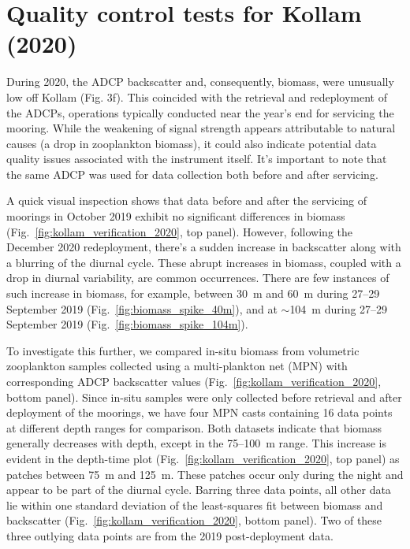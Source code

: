 \documentclass[12pt,a4paper]{article}
\begin{document}
\section{Quality control tests for Kollam (2020)}
\label{sec:QC_kollam}

During 2020, the ADCP backscatter and, consequently, biomass, were unusually low off Kollam (Fig. 3f). This coincided with the retrieval and redeployment of the ADCPs, operations typically conducted near the year's end for servicing the mooring. While the weakening of signal strength appears attributable to natural causes (a drop in zooplankton biomass), it could also indicate potential data quality issues associated with the instrument itself. It's important to note that the same ADCP was used for data collection both before and after servicing.

A quick visual inspection shows that data before and after the servicing of moorings in October 2019 exhibit no significant differences in biomass (Fig.~\ref{fig:kollam_verification_2020}, top panel). However, following the December 2020 redeployment, there's a sudden increase in backscatter along with a blurring of the diurnal cycle. These abrupt increases in biomass, coupled with a drop in diurnal variability, are common occurrences. There are few instances of such increase in biomass, for example, between 30~m and 60~m during 27--29 September 2019 (Fig.~\ref{fig:biomass_spike_40m}), and at $\sim$104~m during 27--29 September 2019 (Fig.~\ref{fig:biomass_spike_104m}).

To investigate this further, we compared in-situ biomass from volumetric zooplankton samples collected using a multi-plankton net (MPN) with corresponding ADCP backscatter values (Fig.~\ref{fig:kollam_verification_2020}, bottom panel). Since in-situ samples were only collected before retrieval and after deployment of the moorings, we have four MPN casts containing 16 data points at different depth ranges for comparison. Both datasets indicate that biomass generally decreases with depth, except in the 75--100~m range. This increase is evident in the depth-time plot (Fig.~\ref{fig:kollam_verification_2020}, top panel) as patches between 75~m and 125~m. These patches occur only during the night and appear to be part of the diurnal cycle. Barring three data points, all other data lie within one standard deviation of the least-squares fit between biomass and backscatter (Fig.~\ref{fig:kollam_verification_2020}, bottom panel). Two of these three outlying data points are from the 2019 post-deployment data.
\end{document}
